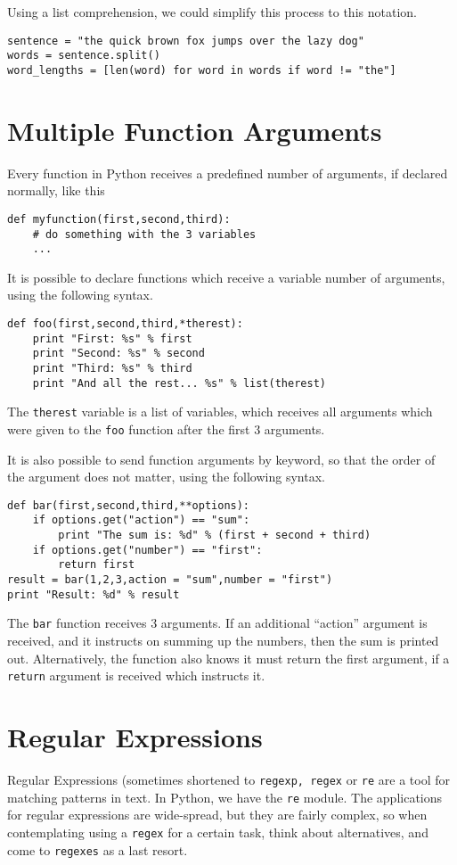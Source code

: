 \documentclass[a4paper,oneside]{book}
\numberwithin{equation}{chapter}
\begin{document}
Using a list comprehension, we could simplify this process to this notation.
\begin{verbatim}
sentence = "the quick brown fox jumps over the lazy dog"
words = sentence.split()
word_lengths = [len(word) for word in words if word != "the"]
\end{verbatim}
\section{Multiple Function Arguments}
Every function in Python receives a predefined number of arguments, if declared normally, like this
\begin{verbatim}
def myfunction(first,second,third):
    # do something with the 3 variables
    ...
\end{verbatim}

It is possible to declare functions which receive a variable number of arguments, using the following syntax. 
\begin{verbatim}
def foo(first,second,third,*therest):
    print "First: %s" % first
    print "Second: %s" % second
    print "Third: %s" % third
    print "And all the rest... %s" % list(therest)
\end{verbatim}

The \texttt{therest} variable is a list of variables, which receives all arguments which were given to the \texttt{foo} function after the first 3 arguments.

It is also possible to send function arguments by keyword, so that the order of the argument does not matter, using the following syntax.
\begin{verbatim}
def bar(first,second,third,**options):
    if options.get("action") == "sum":
        print "The sum is: %d" % (first + second + third)
    if options.get("number") == "first":
        return first
result = bar(1,2,3,action = "sum",number = "first")
print "Result: %d" % result
\end{verbatim}

The \texttt{bar} function receives 3 arguments. If an additional ``action'' argument is received, and it instructs on summing up the numbers, then the sum is printed out. Alternatively, the function also knows it must return the first argument, if a \texttt{return} argument is received which instructs it.
\section{Regular Expressions}
Regular Expressions (sometimes shortened to \texttt{regexp, regex} or \texttt{re} are a tool for matching patterns in text. In Python, we have the \texttt{re} module. The applications for regular expressions are wide-spread, but they are fairly complex, so when contemplating using a \texttt{regex} for a certain task, think about alternatives, and come to \texttt{regexes} as a last resort.
\end{document}

